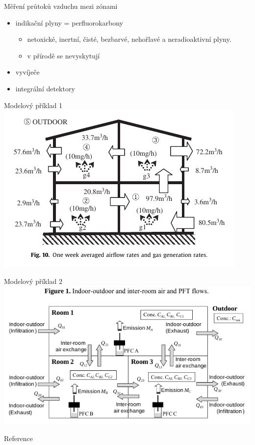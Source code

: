 \documentclass[10pt]{beamer}
\begin{document}
\begin{frame}{Měření průtoků vzduchu mezi zónami}
    \small
    \begin{itemize}
        \item indikační plyny = perfluorokarbony
            \begin{itemize}
                \item netoxické, inertní, čisté, bezbarvé, nehořlavé a neradioaktivní plyny. 
                \item v přírodě se nevyskytují
            \end{itemize}
        \item vyvíječe
        \item integrální detektory 
    \end{itemize}
\end{frame}

\begin{frame}{Modelový příklad 1}
        \centering
        \includegraphics[width=.9\textwidth]{zony.png}
        \cite{japonci}       
\end{frame}

\begin{frame}{Modelový příklad 2}
        \centering
        \includegraphics[width=.9\textwidth]{zony2.png}
        \cite{japonci2}       
\end{frame}



\begin{frame}{Reference}
    \nocite{*}
\renewcommand*{\bibfont}{\tiny}
\printbibliography
\end{frame}
\end{document}
